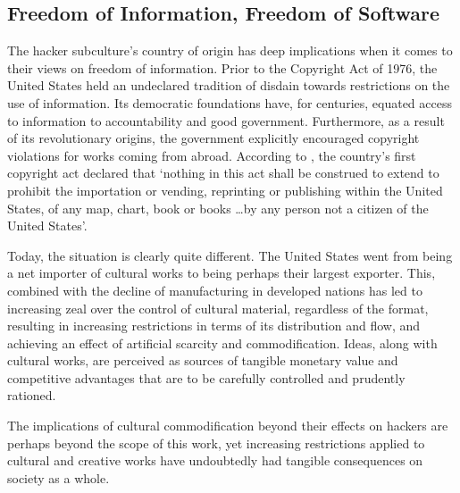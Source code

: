 \subsection{Freedom of Information, Freedom of Software}
\label{freedom}



The hacker subculture's country of origin has deep implications when it comes to their views on freedom of information. Prior to the Copyright Act of 1976, the United States held an undeclared tradition of disdain towards restrictions on the use of information. Its democratic foundations have, for centuries, equated access to information to accountability and good government. Furthermore, as a result of its revolutionary origins, the government explicitly encouraged copyright violations for works coming from abroad. According to \citet{khan06}, the country's first copyright act declared that `nothing in this act shall be construed to extend to prohibit the importation or vending, reprinting or publishing within the United States, of any map, chart, book or books \ldots by any person not a citizen of the United States'.


Today, the situation is clearly quite different. The United States went from being a net importer of cultural works to being perhaps their largest exporter. This, combined with the decline of manufacturing in developed nations has led to increasing zeal over the control of cultural material, regardless of the format, resulting in increasing restrictions in terms of its distribution and flow, and achieving an effect of artificial scarcity and commodification. Ideas, along with cultural works, are perceived as sources of tangible monetary value and competitive advantages that are to be carefully controlled and prudently rationed.

The implications of cultural commodification beyond their effects on hackers are perhaps beyond the scope of this work, yet increasing restrictions applied to cultural and creative works have undoubtedly had tangible consequences on society as a whole.


